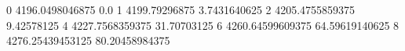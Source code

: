 0 4196.0498046875 0.0
1 4199.79296875 3.7431640625
2 4205.4755859375 9.42578125
4 4227.7568359375 31.70703125
6 4260.64599609375 64.59619140625
8 4276.25439453125 80.20458984375
